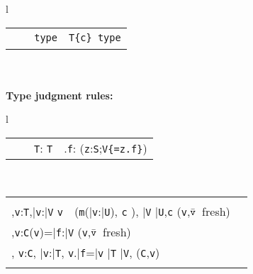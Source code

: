 \begin{figure*}
\begin{tabular}{l}
{\begin{tabular}{p{}p{}p{}}
\infrule[Class]
	{\Gamma \vdash \klass({\tt C})}
	{\Gamma \vdash {\tt C}\ \type} 
&
\infrule[Exist-T]
	{\Gamma\tt \vdash {\tt S}\ \type, {\tt T}\ \type}
	{\Gamma\tt \vdash {\tt x:S;T}\ {\tt type}} 
&
\infrule[Dep]
	{\Gamma\tt \vdash T\ \type \andalso \Gamma, \self:T \vdash c:o}
	{\Gamma\tt \vdash T\{c\}\ {\tt type}} 
\\
\end{tabular}}
\quad\\
\quad\\
{\bf Type judgment rules:}\\[-12pt]
{\tabcolsep=0pt
\begin{tabular}{l}
\begin{tabular}{p{}p{}p{}}
\infax[T-Var]
      {\Gamma, {\tt x}:{\tt T} \vdash {\tt x}:{\tt T\{\self==x\}}}
&
\infrule[T-Cast]
	{\Gamma \vdash {\tt e}:{\tt U} \andalso \Gamma \vdash {\tt T} \ \type}
	{\Gamma \vdash {\tt e}\ \as\ {\tt T}: {\tt T}} &
\infrule[T-Field]
	{\Gamma \vdash {\tt e}: {\tt S} \andalso \Gamma,{\tt z}:{\tt S}\vdash {\tt z}\ \has\ {\tt f}:{\tt V} \andalso \mbox{({\tt z} fresh)} }
	{\Gamma \vdash {\tt e}.{\tt f}:  ({\tt z}:{\tt S};{\tt V\{\self=z.f\}})}
\end{tabular}\\[-12pt]
\begin{tabular}{p{}p{}} 
\infrule[T-Invk]
	{\Gamma \vdash {\tt e}:{\tt T},\bar{\tt e}:\bar{\tt V} \andalso \\
	  \Gamma,{\tt v}:{\tt T},\bar{\tt v}:\bar{\tt V} \vdash
		{\tt v}\ \has\ ({\tt m}(\bar{\tt v}:\bar{\tt U}), {\tt c} \rightarrow {\tt S}), 
		\bar{\tt V} \subtype \bar{\tt U},{\tt c} 
	  \andalso \mbox{({\tt v},$\bar{\tt v}$ fresh)}}
	{\Gamma \vdash {\tt e}.{\tt m}(\bar{\tt e}): ({\tt v}:{\tt T};\bar{\tt v}:\bar{\tt V};S)}
	&
\infrule[T-New]
	{\Gamma \vdash \bar{\tt e}:\bar{\tt T} \andalso \vdash \klass({\tt C}) \\ 
	  \Gamma,{\tt v}:{\tt C}\vdash \fields({\tt v})=\bar{\tt f}:\bar{\tt V}  \andalso \mbox{({\tt v},$\bar{\tt v}$\ fresh)}\\
	  \Gamma, {\tt v}:{\tt C}, \bar{\tt v}:\bar{\tt T}, {\tt v}.\bar{\tt f}=\bar{\tt v} 
	  \vdash \bar{\tt T} \subtype \bar{\tt V}, \inv({\tt C},{\tt v})}
	{\Gamma \vdash \new\ {\tt C}(\bar{\tt e}): {\tt C}\{\bar{\tt v}:\bar{\tt T}; \new\ {\tt C}(\bar{\tt v})=\self, \inv({\tt C},\self)\}}
\\[-12pt]
\infrule[Method OK]
	{\this:{\tt C}\vdash {\tt c}:o \andalso \this:{\tt C},\bar{\tt x}:\bar{\tt V},{\tt c} \vdash {\tt T} \ \type, \bar{\tt V} \ \type, 
}
\end{tabular}
\end{tabular}}
\end{tabular}
\end{figure*}
